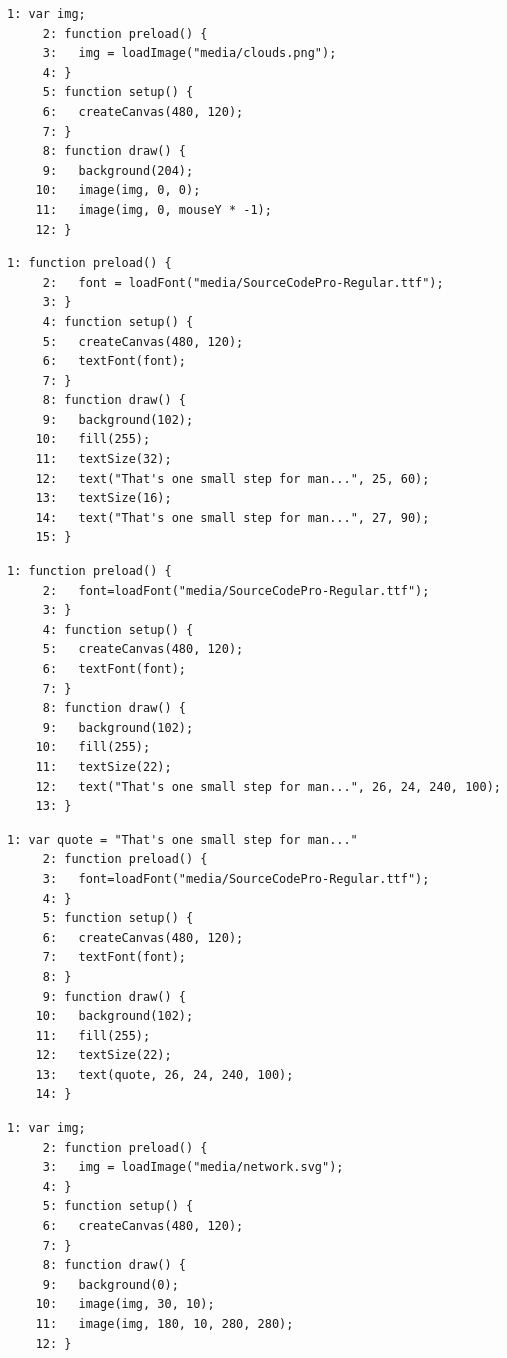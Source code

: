 \documentclass[a4j]{ltjsarticle}
\begin{document}
\vspace{1in}
\begin{lstlisting}[caption=Ex\_07\_05.js]
     1: var img;
     2: function preload() {
     3:   img = loadImage("media/clouds.png");
     4: }
     5: function setup() {
     6:   createCanvas(480, 120);
     7: }
     8: function draw() {
     9:   background(204);
    10:   image(img, 0, 0);
    11:   image(img, 0, mouseY * -1);
    12: }
\end{lstlisting}
\vspace{1in}
\begin{lstlisting}[caption=Ex\_07\_06.js]
     1: function preload() {
     2:   font = loadFont("media/SourceCodePro-Regular.ttf");
     3: }
     4: function setup() {
     5:   createCanvas(480, 120);
     6:   textFont(font);
     7: }
     8: function draw() {
     9:   background(102);
    10:   fill(255);
    11:   textSize(32);
    12:   text("That's one small step for man...", 25, 60);
    13:   textSize(16);
    14:   text("That's one small step for man...", 27, 90);
    15: }
\end{lstlisting}
\vspace{1in}
\begin{lstlisting}[caption=Ex\_07\_07.js]
     1: function preload() {
     2:   font=loadFont("media/SourceCodePro-Regular.ttf");
     3: }
     4: function setup() {
     5:   createCanvas(480, 120);
     6:   textFont(font);
     7: }
     8: function draw() {
     9:   background(102);
    10:   fill(255);
    11:   textSize(22);
    12:   text("That's one small step for man...", 26, 24, 240, 100);
    13: }
\end{lstlisting}
\vspace{1in}
\begin{lstlisting}[caption=Ex\_07\_08.js]
     1: var quote = "That's one small step for man..."
     2: function preload() {
     3:   font=loadFont("media/SourceCodePro-Regular.ttf");
     4: }
     5: function setup() {
     6:   createCanvas(480, 120);
     7:   textFont(font);
     8: }
     9: function draw() {
    10:   background(102);
    11:   fill(255);
    12:   textSize(22);
    13:   text(quote, 26, 24, 240, 100);
    14: }
\end{lstlisting}
\vspace{1in}
\begin{lstlisting}[caption=Ex\_07\_09.js]
     1: var img;
     2: function preload() {
     3:   img = loadImage("media/network.svg");
     4: }
     5: function setup() {
     6:   createCanvas(480, 120);
     7: }
     8: function draw() {
     9:   background(0);
    10:   image(img, 30, 10);
    11:   image(img, 180, 10, 280, 280);
    12: }
\end{lstlisting}
\end{document}
